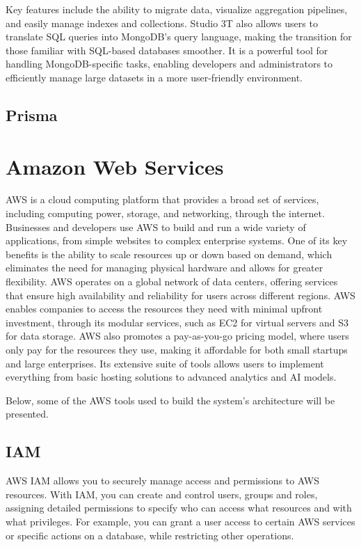 Key features include the ability to migrate data, visualize aggregation pipelines, and easily manage indexes and collections. Studio 3T also allows users to translate \ac{SQL} queries into MongoDB's query language, making the transition for those familiar with \ac{SQL}-based databases smoother. It is a powerful tool for handling MongoDB-specific tasks, enabling developers and administrators to efficiently manage large datasets in a more user-friendly environment.

\subsection{Prisma}

\section{Amazon Web Services}
\acf{AWS} is a cloud computing platform that provides a broad set of services, including computing power, storage, and networking, through the internet. Businesses and developers use \ac{AWS} to build and run a wide variety of applications, from simple websites to complex enterprise systems. One of its key benefits is the ability to scale resources up or down based on demand, which eliminates the need for managing physical hardware and allows for greater flexibility. \ac{AWS} operates on a global network of data centers, offering services that ensure high availability and reliability for users across different regions. \ac{AWS} enables companies to access the resources they need with minimal upfront investment, through its modular services, such as \ac{EC2} for virtual servers and \ac{S3} for data storage. \ac{AWS} also promotes a pay-as-you-go pricing model, where users only pay for the resources they use, making it affordable for both small startups and large enterprises. Its extensive suite of tools allows users to implement everything from basic hosting solutions to advanced analytics and AI models.

Below, some of the \ac{AWS} tools used to build the system's architecture will be presented.
\subsection{IAM}
\ac{AWS} \ac{IAM} allows you to securely manage access and permissions to \ac{AWS} resources. With IAM, you can create and control users, groups and roles, assigning detailed permissions to specify who can access what resources and with what privileges. For example, you can grant a user access to certain \ac{AWS} services or specific actions on a database, while restricting other operations.


